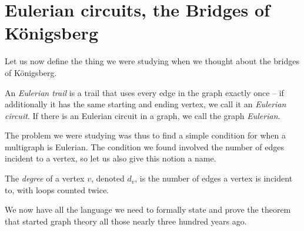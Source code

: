 \documentclass[nobib]{tufte-handout}
\begin{document}
\section{Eulerian circuits, the Bridges of Königsberg}

Let us now define the thing we were studying when we thought about the bridges of Königsberg.

\begin{definition}
  An \emph{Eulerian trail} is a trail that uses every edge in the graph exactly once -- if additionally it has the same starting and ending vertex, we call it an \emph{Eulerian circuit}. If there is an Eulerian circuit in a graph, we call the graph \emph{Eulerian}.
\end{definition}

The problem we were studying was thus to find a simple condition for when a multigraph is Eulerian. The condition we found involved the number of edges incident to a vertex, so let us also give this notion a name.

\begin{definition}
  The \emph{degree} of a vertex $v$, denoted $d_v$, is the number of edges a vertex is incident to, with loops counted twice.
\end{definition}

We now have all the language we need to formally state and prove the theorem that started graph theory all those nearly three hundred years ago.
\end{document}
